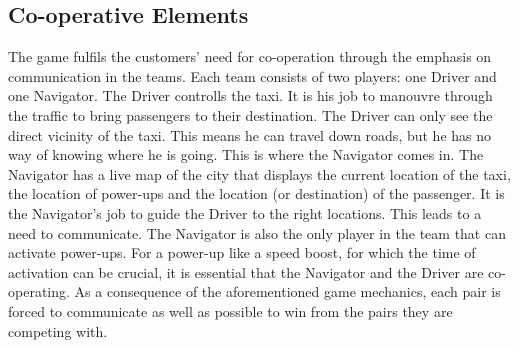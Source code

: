 \subsection{Co-operative Elements}
The game fulfils the customers' need for co-operation through the emphasis on communication in the teams. Each team consists of two players: one Driver and one Navigator. The Driver controlls the taxi. It is his job to manouvre through the traffic to bring passengers to their destination. The Driver can only see the direct vicinity of the taxi. This means he can travel down roads, but he has no way of knowing where he is going. This is where the Navigator comes in. The Navigator has a live map of the city that displays the current location of the taxi, the location of power-ups and the location (or destination) of the passenger. It is the Navigator's job to guide the Driver to the right locations. This leads to a need to communicate. The Navigator is also the only player in the team that can activate power-ups. For a power-up like a speed boost, for which the time of activation can be crucial, it is essential that the Navigator and the Driver are co-operating. As a consequence of the aforementioned game mechanics, each pair is forced to communicate as well as possible to win from the pairs they are competing with.


